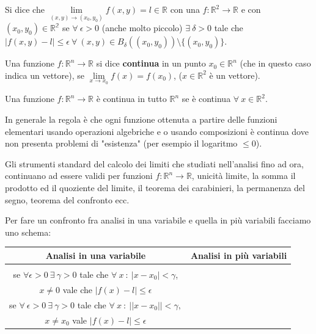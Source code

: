 \begin{definition}\label{def-3}
Si dice che $\lim\limits_{(x,y) \to (x_0, y_0)} f(x,y) = l \in \mathbb{R}$ con una $f: \mathbb{R}^2 \to \mathbb{R}$ e con $(x_0, y_0) \in \mathbb{R^2}$ se $\forall \: \epsilon > 0$ (anche molto piccolo) $\exists \: \delta > 0$ tale che $|f(x,y) - l| \leq \epsilon \:\forall \: (x,y) \in B_{\delta}((x_0, y_0)) \setminus \{(x_0, y_0)\}$.
\end{definition}

\begin{definition}
Una funzione $f: \mathbb{R}^n \to \mathbb{R}$ si dice \textbf{continua} in un punto $x_0 \in \mathbb{R}^n$ (che in questo caso indica un vettore), se $\lim\limits_{x\to x_0}f(x) = f(x_0)$, ($x \in \mathbb{R}^2$ è un vettore).
\end{definition}

\begin{definition}
Una funzione $f: \mathbb{R}^n \to \mathbb{R}$ è continua in tutto $\mathbb{R}^n$ se è continua $\forall \: x \in \mathbb{R}^2$.
\end{definition}
\hspace{-15pt}In generale la regola è che ogni funzione ottenuta a partire delle funzioni elementari usando operazioni algebriche e o usando composizioni è continua dove non presenta problemi di "esistenza" (per esempio il logaritmo $\leq 0$).

\begin{observation}
Gli strumenti standard del calcolo dei limiti che studiati nell'analisi fino ad ora, continuano ad essere validi per funzioni $f: \mathbb{R}^n \to \mathbb{R}$, unicità limite, la somma il prodotto ed il quoziente del limite, il teorema dei carabinieri, la permanenza del segno, teorema del confronto ecc.
\end{observation}

\hspace{-15pt}Per fare un confronto fra analisi in una variabile e quella in più variabili facciamo uno schema:
\begin{table}[h!]
    \centering
    \setlength{\tabcolsep}{7pt}
    \renewcommand{\arraystretch}{1.7}
    \begin{tabular}{|c|c|}
    \hline
    Analisi in una variabile & Analisi in più variabili \\\hline
    \makecell{    $f: \mathbb{R}\to \mathbb{R}$, $\lim\limits_{x\to x_0}f(x) = l \in \mathbb{R}$\\
    se $\forall \epsilon > 0 \:\exists\: \gamma > 0$ tale che $\forall \:x \::\: |x - x_0|< \gamma$,\\
    $x \neq 0$ vale che $|f(x) - l| \leq \epsilon$} & \makecell{$f: \mathbb{R}^n \to \mathbb{R}, x \in \mathbb{R}^n, x_0 \in \mathbb{R}^n, \lim\limits_{x\to x_0}f(x) = l$\\ se $\forall \: \epsilon > 0 \: \exists \: \gamma > 0$ tale che $\forall \: x \::\: ||x-x_0|| < \gamma,$\\
    $x \neq x_0$ vale $|f(x) - l| \leq \epsilon$}\\\hline
    \end{tabular}
\end{table}

